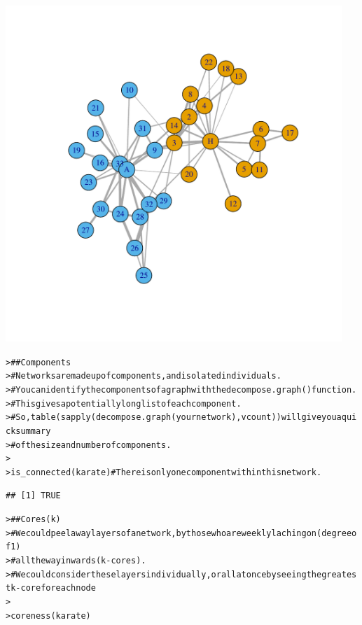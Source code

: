 \documentclass[12pt]{article}\usepackage[]{graphicx}\usepackage[]{color}
\makeatletter
\newcommand{\hlcom}[1]{\textcolor[rgb]{0.404,0.408,0.42}{#1}}%
\newcommand{\hlstd}[1]{\textcolor[rgb]{0.882,0.878,0.898}{#1}}%
\newcommand{\hlkwd}[1]{\textcolor[rgb]{0.733,0.388,0.812}{#1}}%
\newenvironment{kframe}{%
 \def\at@end@of@kframe{}%
 \ifinner\ifhmode%
  \def\at@end@of@kframe{\end{minipage}}%
  \begin{minipage}{\columnwidth}%
 \fi\fi%
 \def\FrameCommand##1{\hskip\@totalleftmargin \hskip-\fboxsep
 \colorbox{shadecolor}{##1}\hskip-\fboxsep
     \hskip-\linewidth \hskip-\@totalleftmargin \hskip\columnwidth}%
 \MakeFramed {\advance\hsize-\width
   \@totalleftmargin\z@ \linewidth\hsize
   \@setminipage}}%
 {\par\unskip\endMakeFramed%
 \at@end@of@kframe}
\newenvironment{knitrout}{}{} %
\makeatother
\begin{document}
\begin{flushleft}
\begin{center}
\begin{knitrout}
\includegraphics[width=5in]{figure/Assort-1} 
\begin{kframe}\begin{alltt}
\hlstd{> }\hlcom{## Components}
\hlstd{> }\hlcom{#   Networks are made up of components, and isolated individuals.}
\hlstd{> }\hlcom{#  You can identify the components of a graph with the decompose.graph() function.}
\hlstd{> }\hlcom{#  This gives a potentially long list of each component.}
\hlstd{> }\hlcom{#  So, table(sapply(decompose.graph(yournetwork),vcount)) will give you a quick summary}
\hlstd{> }\hlcom{#       of the size and number of components.}
\hlstd{> }
\hlstd{> }\hlkwd{is_connected}\hlstd{(karate)}  \hlcom{# There is only one component within this network.}
\end{alltt}
\begin{verbatim}
## [1] TRUE
\end{verbatim}
\begin{alltt}
\hlstd{> }\hlcom{## Cores (k)}
\hlstd{> }\hlcom{#   We could peel away layers of a network, by those who are weekly laching on (degree of 1)}
\hlstd{> }\hlcom{#      all the way inwards (k-cores).}
\hlstd{> }\hlcom{#   We could consider these layers individually, or all at once by seeing the greatest k-core for each node}
\hlstd{> }
\hlstd{> }\hlkwd{coreness}\hlstd{(karate)}
\end{alltt}
\begin{verbatim}

\end{verbatim}
\end{kframe}
\end{knitrout}
\end{center}
\end{flushleft}
\end{document}

